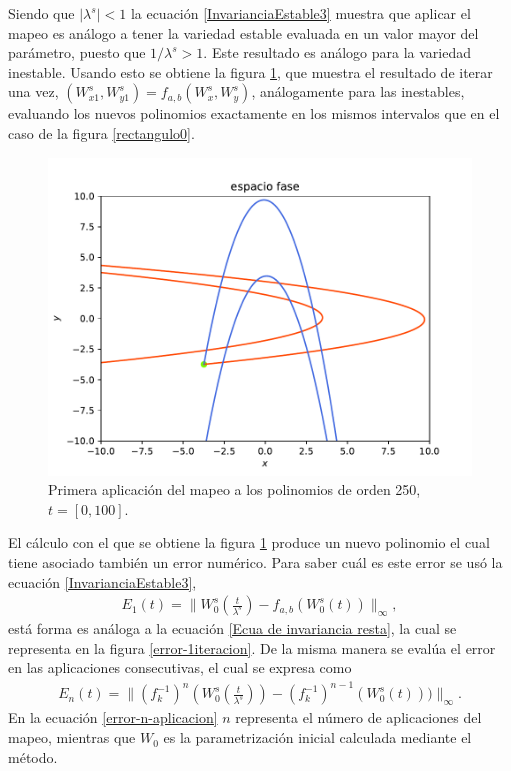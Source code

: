 Siendo que $\vert \lambda^{s} \vert < 1 $ la ecuación \eqref{InvarianciaEstable3} muestra que aplicar el mapeo es análogo a tener la variedad estable evaluada en un valor mayor del parámetro, puesto que $1/\lambda^{s}>1$. Este resultado es análogo para la variedad inestable. Usando esto se obtiene la figura \ref{Rectangulo1}, que muestra el resultado de iterar una vez, $(W_{x1}^{s},W_{y1}^{s})=f_{a,b}(W_{x}^{s},W_{y}^{s})$, análogamente para las inestables, evaluando los nuevos polinomios exactamente en los mismos intervalos que en el caso de la figura \ref{rectangulo0}.
\begin{figure}[H]
\centering
\includegraphics[scale=0.7]{rectangulo1.pdf}
\caption{Primera aplicación del mapeo a los polinomios de orden 250, $t=[0,100]$.}
\label{Rectangulo1}
\end{figure}
El cálculo con el que se obtiene la figura \ref{Rectangulo1} produce un nuevo polinomio el cual tiene asociado también un error numérico. Para saber cuál es este error se usó la ecuación \eqref{InvarianciaEstable3},
\begin{eqnarray}
E_{1}(t)=\bigg\| W_{0}^{s}\left(\frac{t}{\lambda^{s}}\right)-f_{a,b}(W_{0}^{s}(t))\bigg\|_{\infty},
\label{error-1aplicacion}
\end{eqnarray}
está forma es análoga a la ecuación \eqref{Ecua de invariancia resta}, la cual se representa en la figura \ref{error-1iteracion}. De la misma manera se evalúa el error en las aplicaciones consecutivas, el cual se expresa como
\begin{eqnarray}
E_{n}(t)=\bigg\| (f^{-1}_{k})^{n}\left(W_{0}^{s}\left(\frac{t}{\lambda^{s}}\right)\right)- (f^{-1}_{k})^{n-1}(W_{0}^{s}(t)))\bigg\|_{\infty}.
\label{error-n-aplicacion}
\end{eqnarray}
En la ecuación \eqref{error-n-aplicacion} $n$ representa el número de aplicaciones del mapeo, mientras que $W_{0}$ es la parametrización inicial calculada mediante el método.\\

